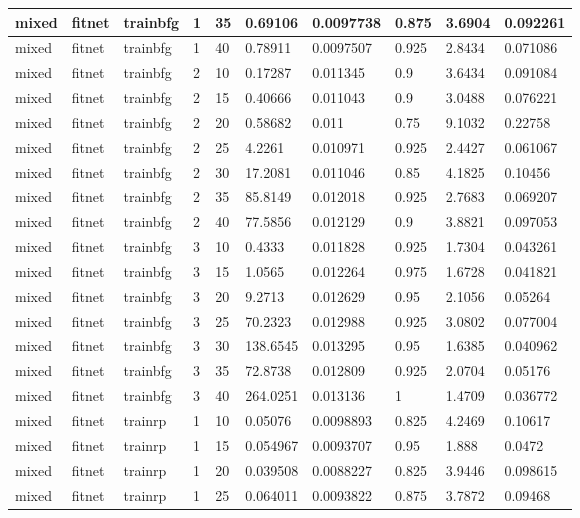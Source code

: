 \begin{longtable}{lllllllll}
mixed & fitnet & trainbfg & 1 & 35 & 0.69106 & 0.0097738 & 0.875 & 3.6904 & 0.092261 \\ \hline 
mixed & fitnet & trainbfg & 1 & 40 & 0.78911 & 0.0097507 & 0.925 & 2.8434 & 0.071086 \\ \hline 
mixed & fitnet & trainbfg & 2 & 10 & 0.17287 & 0.011345 & 0.9 & 3.6434 & 0.091084 \\ \hline 
mixed & fitnet & trainbfg & 2 & 15 & 0.40666 & 0.011043 & 0.9 & 3.0488 & 0.076221 \\ \hline 
mixed & fitnet & trainbfg & 2 & 20 & 0.58682 & 0.011 & 0.75 & 9.1032 & 0.22758 \\ \hline 
mixed & fitnet & trainbfg & 2 & 25 & 4.2261 & 0.010971 & 0.925 & 2.4427 & 0.061067 \\ \hline 
mixed & fitnet & trainbfg & 2 & 30 & 17.2081 & 0.011046 & 0.85 & 4.1825 & 0.10456 \\ \hline 
mixed & fitnet & trainbfg & 2 & 35 & 85.8149 & 0.012018 & 0.925 & 2.7683 & 0.069207 \\ \hline 
mixed & fitnet & trainbfg & 2 & 40 & 77.5856 & 0.012129 & 0.9 & 3.8821 & 0.097053 \\ \hline 
mixed & fitnet & trainbfg & 3 & 10 & 0.4333 & 0.011828 & 0.925 & 1.7304 & 0.043261 \\ \hline 
mixed & fitnet & trainbfg & 3 & 15 & 1.0565 & 0.012264 & 0.975 & 1.6728 & 0.041821 \\ \hline 
mixed & fitnet & trainbfg & 3 & 20 & 9.2713 & 0.012629 & 0.95 & 2.1056 & 0.05264 \\ \hline 
mixed & fitnet & trainbfg & 3 & 25 & 70.2323 & 0.012988 & 0.925 & 3.0802 & 0.077004 \\ \hline 
mixed & fitnet & trainbfg & 3 & 30 & 138.6545 & 0.013295 & 0.95 & 1.6385 & 0.040962 \\ \hline 
mixed & fitnet & trainbfg & 3 & 35 & 72.8738 & 0.012809 & 0.925 & 2.0704 & 0.05176 \\ \hline 
mixed & fitnet & trainbfg & 3 & 40 & 264.0251 & 0.013136 & 1 & 1.4709 & 0.036772 \\ \hline 
mixed & fitnet & trainrp & 1 & 10 & 0.05076 & 0.0098893 & 0.825 & 4.2469 & 0.10617 \\ \hline 
mixed & fitnet & trainrp & 1 & 15 & 0.054967 & 0.0093707 & 0.95 & 1.888 & 0.0472 \\ \hline 
mixed & fitnet & trainrp & 1 & 20 & 0.039508 & 0.0088227 & 0.825 & 3.9446 & 0.098615 \\ \hline 
mixed & fitnet & trainrp & 1 & 25 & 0.064011 & 0.0093822 & 0.875 & 3.7872 & 0.09468 \\ \hline 

\end{longtable}
